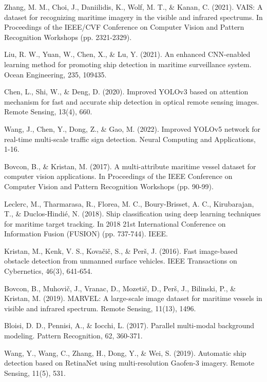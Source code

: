 \documentclass[12pt,a4paper]{report}
\begin{document}
\begin{thebibliography}{99}
Zhang, M. M., Choi, J., Daniilidis, K., Wolf, M. T., \& Kanan, C. (2021). VAIS: A dataset for recognizing maritime imagery in the visible and infrared spectrums. In Proceedings of the IEEE/CVF Conference on Computer Vision and Pattern Recognition Workshops (pp. 2321-2329).

Liu, R. W., Yuan, W., Chen, X., \& Lu, Y. (2021). An enhanced CNN-enabled learning method for promoting ship detection in maritime surveillance system. Ocean Engineering, 235, 109435.

Chen, L., Shi, W., \& Deng, D. (2020). Improved YOLOv3 based on attention mechanism for fast and accurate ship detection in optical remote sensing images. Remote Sensing, 13(4), 660.

Wang, J., Chen, Y., Dong, Z., \& Gao, M. (2022). Improved YOLOv5 network for real-time multi-scale traffic sign detection. Neural Computing and Applications, 1-16.

Bovcon, B., \& Kristan, M. (2017). A multi-attribute maritime vessel dataset for computer vision applications. In Proceedings of the IEEE Conference on Computer Vision and Pattern Recognition Workshops (pp. 90-99).

Leclerc, M., Tharmarasa, R., Florea, M. C., Boury-Brisset, A. C., Kirubarajan, T., \& Duclos-Hindié, N. (2018). Ship classification using deep learning techniques for maritime target tracking. In 2018 21st International Conference on Information Fusion (FUSION) (pp. 737-744). IEEE.

Kristan, M., Kenk, V. S., Kovačič, S., \& Perš, J. (2016). Fast image-based obstacle detection from unmanned surface vehicles. IEEE Transactions on Cybernetics, 46(3), 641-654.

Bovcon, B., Muhovič, J., Vranac, D., Mozetič, D., Perš, J., Bilinski, P., \& Kristan, M. (2019). MARVEL: A large-scale image dataset for maritime vessels in visible and infrared spectrum. Remote Sensing, 11(13), 1496.

Bloisi, D. D., Pennisi, A., \& Iocchi, L. (2017). Parallel multi-modal background modeling. Pattern Recognition, 62, 360-371.

Wang, Y., Wang, C., Zhang, H., Dong, Y., \& Wei, S. (2019). Automatic ship detection based on RetinaNet using multi-resolution Gaofen-3 imagery. Remote Sensing, 11(5), 531.


\end{thebibliography}
\end{document}
